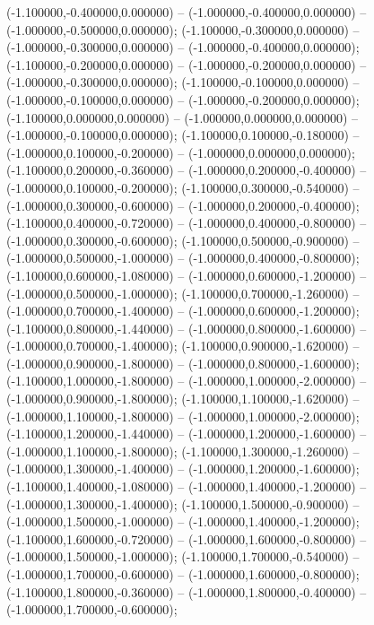  (-1.100000,-0.400000,0.000000) -- (-1.000000,-0.400000,0.000000) -- (-1.000000,-0.500000,0.000000);
 (-1.100000,-0.300000,0.000000) -- (-1.000000,-0.300000,0.000000) -- (-1.000000,-0.400000,0.000000);
 (-1.100000,-0.200000,0.000000) -- (-1.000000,-0.200000,0.000000) -- (-1.000000,-0.300000,0.000000);
 (-1.100000,-0.100000,0.000000) -- (-1.000000,-0.100000,0.000000) -- (-1.000000,-0.200000,0.000000);
 (-1.100000,0.000000,0.000000) -- (-1.000000,0.000000,0.000000) -- (-1.000000,-0.100000,0.000000);
 (-1.100000,0.100000,-0.180000) -- (-1.000000,0.100000,-0.200000) -- (-1.000000,0.000000,0.000000);
 (-1.100000,0.200000,-0.360000) -- (-1.000000,0.200000,-0.400000) -- (-1.000000,0.100000,-0.200000);
 (-1.100000,0.300000,-0.540000) -- (-1.000000,0.300000,-0.600000) -- (-1.000000,0.200000,-0.400000);
 (-1.100000,0.400000,-0.720000) -- (-1.000000,0.400000,-0.800000) -- (-1.000000,0.300000,-0.600000);
 (-1.100000,0.500000,-0.900000) -- (-1.000000,0.500000,-1.000000) -- (-1.000000,0.400000,-0.800000);
 (-1.100000,0.600000,-1.080000) -- (-1.000000,0.600000,-1.200000) -- (-1.000000,0.500000,-1.000000);
 (-1.100000,0.700000,-1.260000) -- (-1.000000,0.700000,-1.400000) -- (-1.000000,0.600000,-1.200000);
 (-1.100000,0.800000,-1.440000) -- (-1.000000,0.800000,-1.600000) -- (-1.000000,0.700000,-1.400000);
 (-1.100000,0.900000,-1.620000) -- (-1.000000,0.900000,-1.800000) -- (-1.000000,0.800000,-1.600000);
 (-1.100000,1.000000,-1.800000) -- (-1.000000,1.000000,-2.000000) -- (-1.000000,0.900000,-1.800000);
 (-1.100000,1.100000,-1.620000) -- (-1.000000,1.100000,-1.800000) -- (-1.000000,1.000000,-2.000000);
 (-1.100000,1.200000,-1.440000) -- (-1.000000,1.200000,-1.600000) -- (-1.000000,1.100000,-1.800000);
 (-1.100000,1.300000,-1.260000) -- (-1.000000,1.300000,-1.400000) -- (-1.000000,1.200000,-1.600000);
 (-1.100000,1.400000,-1.080000) -- (-1.000000,1.400000,-1.200000) -- (-1.000000,1.300000,-1.400000);
 (-1.100000,1.500000,-0.900000) -- (-1.000000,1.500000,-1.000000) -- (-1.000000,1.400000,-1.200000);
 (-1.100000,1.600000,-0.720000) -- (-1.000000,1.600000,-0.800000) -- (-1.000000,1.500000,-1.000000);
 (-1.100000,1.700000,-0.540000) -- (-1.000000,1.700000,-0.600000) -- (-1.000000,1.600000,-0.800000);
 (-1.100000,1.800000,-0.360000) -- (-1.000000,1.800000,-0.400000) -- (-1.000000,1.700000,-0.600000);
